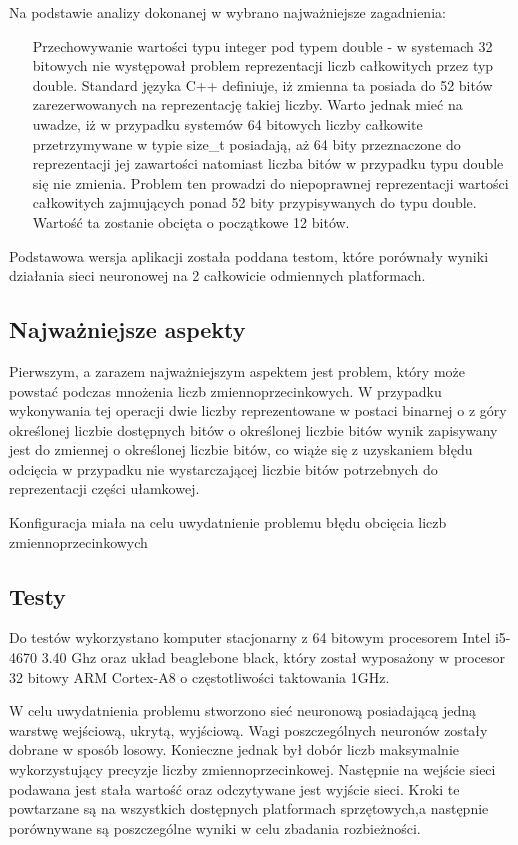 Na podstawie analizy dokonanej w %
wybrano najważniejsze zagadnienia:
\begin{itemize}
	\item [Przechowywanie wartości typu integer pod typem double] - w systemach 32 bitowych nie występował problem reprezentacji liczb całkowitych przez typ double. Standard języka C++ definiuje, iż zmienna ta posiada do 52 bitów zarezerwowanych na reprezentację takiej liczby. Warto jednak mieć na uwadze, iż w przypadku systemów 64 bitowych liczby całkowite przetrzymywane w typie size\_t posiadają, aż 64 bity przeznaczone do reprezentacji jej zawartości natomiast liczba bitów w przypadku typu double się nie zmienia. Problem ten prowadzi do niepoprawnej reprezentacji wartości całkowitych zajmujących ponad 52 bity przypisywanych do typu double. Wartość ta zostanie obcięta o początkowe 12 bitów.
\end{itemize}



Podstawowa wersja aplikacji została poddana testom, które porównały wyniki działania sieci neuronowej na 2 całkowicie odmiennych platformach. 


\subsection{Najważniejsze aspekty}
Pierwszym, a zarazem najważniejszym aspektem jest problem, który może powstać podczas mnożenia liczb zmiennoprzecinkowych. W przypadku wykonywania tej operacji dwie liczby reprezentowane w postaci binarnej o z góry określonej liczbie dostępnych bitów o określonej liczbie bitów  wynik zapisywany jest do zmiennej o określonej liczbie bitów, co wiąże się z uzyskaniem błędu odcięcia w przypadku nie wystarczającej liczbie bitów potrzebnych do reprezentacji części ułamkowej. 



Konfiguracja miała na celu uwydatnienie problemu błędu obcięcia liczb zmiennoprzecinkowych 

\subsection{Testy}
Do testów wykorzystano komputer stacjonarny z 64 bitowym procesorem Intel i5-4670 3.40 Ghz oraz układ beaglebone black, który został wyposażony w procesor 32 bitowy ARM Cortex-A8 o częstotliwości taktowania 1GHz.

W celu uwydatnienia problemu stworzono sieć neuronową posiadającą jedną  warstwę wejściową, ukrytą, wyjściową. Wagi poszczególnych neuronów zostały dobrane w sposób losowy. Konieczne jednak był dobór liczb maksymalnie wykorzystujący precyzje liczby zmiennoprzecinkowej. Następnie na wejście sieci podawana jest stała wartość oraz odczytywane jest wyjście sieci. Kroki te powtarzane są na wszystkich dostępnych platformach sprzętowych,a następnie porównywane są poszczególne wyniki w celu zbadania rozbieżności.






